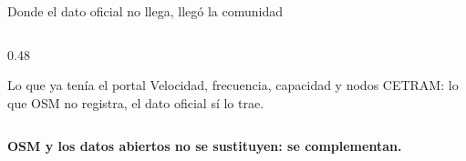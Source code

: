 \begin{frame}{Donde el dato oficial no llega, llegó la comunidad}
\begin{columns}[T]
\begin{column}{0.48\textwidth}
\begin{block}{\footnotesize Lo que ya tenía el portal}
        \vspace{0.05cm}
        Velocidad, frecuencia, capacidad y nodos CETRAM: lo que OSM no
        registra, el dato oficial sí lo trae.
      \end{block}
    \end{column}
  \end{columns}

  \vspace{0.3cm}
  \centering
  {\small\bfseries\color{SotmVerde} OSM y los datos abiertos no se sustituyen: se complementan.}
\end{frame}
